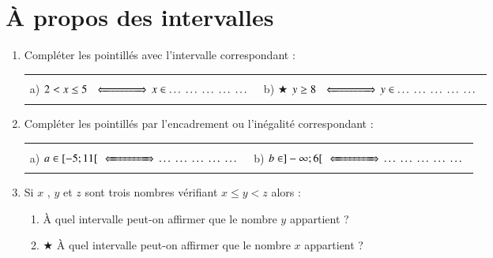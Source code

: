 \documentclass[oneside,12pt]{exam}          %
\begin{document}
\section{À propos des intervalles}
\begin{enumerate}[itemsep = 2mm]
	\item Compléter les pointillés avec l'intervalle correspondant : \\
	
	\begin{tabular}{p{} p{}}
		a) $2 < x \leq 5 \, \ssi{15mm}\,  x \in \ldots\ldots\ldots\ldots\ldots$ &
		b) $\bigstar$ $y \geq 8 \, \ssi{15mm}\,  y \in \ldots\ldots\ldots\ldots\ldots$ 
	\end{tabular}
	
	\item Compléter les pointillés par l'encadrement ou l'inégalité correspondant  : \\

	\begin{tabular}{p{} p{}}
		a) $a \in [-5 ; 11[ \, \ssi{15mm}\, \ldots\ldots\ldots\ldots\ldots$ &
		b) $b \in ]-\infty ; 6[ \, \ssi{15mm}\, \ldots\ldots\ldots\ldots\ldots$
	\end{tabular}
	
	\item Si $x$ , $y$ et $z$ sont trois nombres vérifiant $x \leq y < z$ alors :
	\begin{enumerate}
		\item À quel intervalle peut-on affirmer que le nombre $y$ appartient ?
		\item $\bigstar$ À quel intervalle peut-on affirmer que le nombre $x$ appartient ?
	\end{enumerate}
\end{enumerate}
\end{document}
